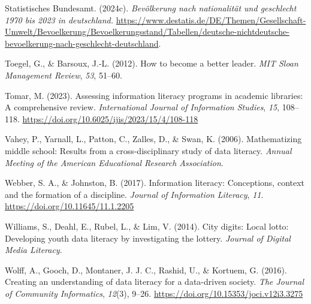 \documentclass[
  12pt,
  a4paper,
  twoside]{article}
\newlength{\cslhangindent}
\newenvironment{CSLReferences}[2] %
 {\begin{list}{}{%
  \setlength{\itemindent}{0pt}
  \setlength{\leftmargin}{0pt}
  \setlength{\parsep}{0pt}
  \ifodd #1
   \setlength{\leftmargin}{\cslhangindent}
   \setlength{\itemindent}{-1\cslhangindent}
  \fi
  \setlength{\itemsep}{#2\baselineskip}}}
 {\end{list}}
\begin{document}
\begin{CSLReferences}{1}{0}
Statistisches Bundesamt. (2024c). \emph{Bevölkerung nach nationalität und geschlecht 1970 bis 2023 in deutschland.} \url{https://www.destatis.de/DE/Themen/Gesellschaft-Umwelt/Bevoelkerung/Bevoelkerungsstand/Tabellen/deutsche-nichtdeutsche-bevoelkerung-nach-geschlecht-deutschland}.

Toegel, G., \& Barsoux, J.-L. (2012). How to become a better leader. \emph{MIT Sloan Management Review}, \emph{53}, 51--60.

Tomar, M. (2023). Assessing information literacy programs in academic libraries: A comprehensive review. \emph{International Journal of Information Studies}, \emph{15}, 108--118. \url{https://doi.org/10.6025/ijis/2023/15/4/108-118}

Vahey, P., Yarnall, L., Patton, C., Zalles, D., \& Swan, K. (2006). Mathematizing middle school: Results from a cross-disciplinary study of data literacy. \emph{Annual Meeting of the American Educational Research Association}.

Webber, S. A., \& Johnston, B. (2017). Information literacy: Conceptions, context and the formation of a discipline. \emph{Journal of Information Literacy}, \emph{11}. \url{https://doi.org/10.11645/11.1.2205}

Williams, S., Deahl, E., Rubel, L., \& Lim, V. (2014). City digits: Local lotto: Developing youth data literacy by investigating the lottery. \emph{Journal of Digital Media Literacy}.

Wolff, A., Gooch, D., Montaner, J. J. C., Rashid, U., \& Kortuem, G. (2016). Creating an understanding of data literacy for a data-driven society. \emph{The Journal of Community Informatics}, \emph{12}(3), 9--26. \url{https://doi.org/10.15353/joci.v12i3.3275}

\end{CSLReferences}
\end{document}
